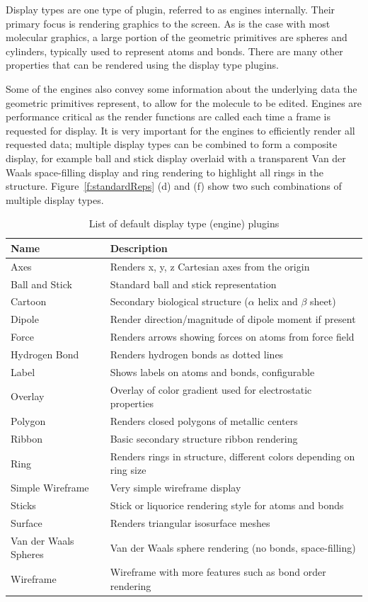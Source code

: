 \documentclass[10pt]{bmc_article}
\newenvironment{bmcformat}{\begin{raggedright}
\baselineskip20pt\sloppy\setboolean{publ}{false}}{\end{raggedright}
\baselineskip20pt\sloppy}
\begin{document}
\begin{bmcformat}
Display types are one type of plugin, referred to as engines internally. Their
primary focus is rendering graphics to the screen. As is the case with most
molecular graphics, a large portion of the geometric primitives are spheres and
cylinders, typically used to represent atoms and bonds. There are many other
properties that can be rendered using the display type plugins.

Some of the engines also convey some information about the underlying data the
geometric primitives represent, to allow for the molecule to be edited.
Engines are performance critical as the render functions are called each time a
frame is requested for display. It is very important for the engines to
efficiently render all requested data; multiple display types can be
combined to form a composite display, for example ball and stick display
overlaid with a transparent Van der Waals space-filling display and ring
rendering to highlight all rings in the structure. Figure~\ref{f:standardReps}
(d) and (f) show two such combinations of multiple display types.

\begin{table}
\caption{List of default display type (engine) plugins}
\begin{tabular}{l | l}
\hline
Name & Description \\
\hline
Axes & Renders x, y, z Cartesian axes from the origin \\
Ball and Stick & Standard ball and stick representation \\
Cartoon & Secondary biological structure ($\alpha$ helix and $\beta$ sheet) \\
Dipole & Render direction/magnitude of dipole moment if present \\
Force & Renders arrows showing forces on atoms from force field \\
Hydrogen Bond & Renders hydrogen bonds as dotted lines \\
Label & Shows labels on atoms and bonds, configurable \\
Overlay & Overlay of color gradient used for electrostatic properties \\
Polygon & Renders closed polygons of metallic centers \\
Ribbon & Basic secondary structure ribbon rendering \\
Ring & Renders rings in structure, different colors depending on ring size \\
Simple Wireframe & Very simple wireframe display \\
Sticks & Stick or liquorice rendering style for atoms and bonds \\
Surface &Renders triangular isosurface meshes \\
Van der Waals Spheres & Van der Waals sphere rendering (no bonds, space-filling) \\
Wireframe & Wireframe with more features such as bond order rendering \\
\hline
\end{tabular}
\end{table}


\end{bmcformat}
\end{document}
